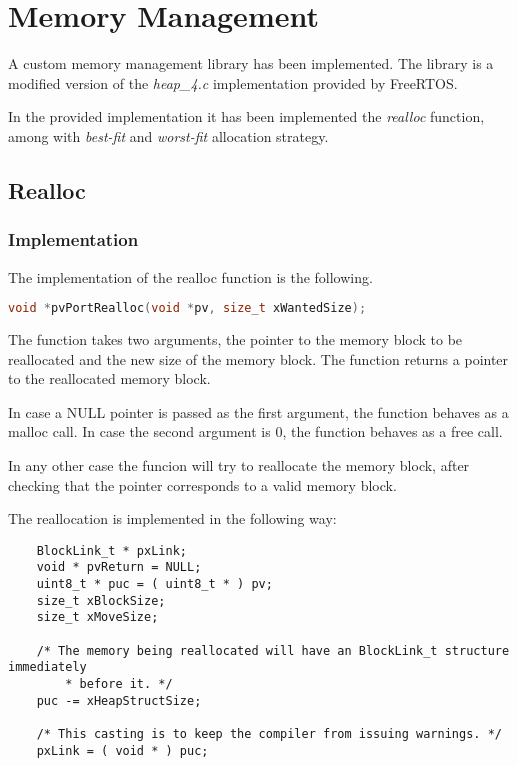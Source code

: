 \section{Memory Management}

A custom memory management library has been implemented. The library is a modified version of the \textit{heap\_4.c} implementation provided by FreeRTOS.

In the provided implementation it has been implemented the \textit{realloc} function, among with \textit{best-fit} and \textit{worst-fit} allocation strategy.

\subsection{Realloc}
    \subsubsection{Implementation}
    The implementation of the realloc function is the following.

    \begin{lstlisting}[language=c,breaklines]
    void *pvPortRealloc(void *pv, size_t xWantedSize);
    \end{lstlisting}

    The function takes two arguments, the pointer to the memory block to be reallocated and the new size of the memory block. The function returns a pointer to the reallocated memory block.

    In case a NULL pointer is passed as the first argument, the function behaves as a malloc call. In case the second argument is 0, the function behaves as a free call.
    
    In any other case the funcion will try to reallocate the memory block, after checking that the pointer corresponds to a valid memory block.

    The reallocation is implemented in the following way:

    \begin{codebox}
    \begin{lstlisting}
    BlockLink_t * pxLink;
    void * pvReturn = NULL;
    uint8_t * puc = ( uint8_t * ) pv;
    size_t xBlockSize;
    size_t xMoveSize;

    /* The memory being reallocated will have an BlockLink_t structure immediately
        * before it. */
    puc -= xHeapStructSize;

    /* This casting is to keep the compiler from issuing warnings. */
    pxLink = ( void * ) puc;
    \end{lstlisting}
    \end{codebox}


